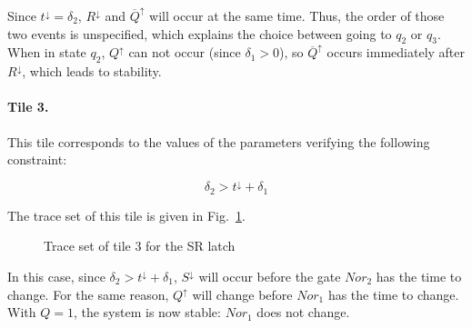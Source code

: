 \documentclass[a4paper,10pt]{article}
\begin{document}
Since $t^\downarrow = \delta_2$, $R^\downarrow$ and $\overline{Q}^\uparrow$ will occur at the same time.
Thus, the order of those two events is unspecified, which explains the choice between going to $q_2$ or $q_3$.
When in state $q_2$, $Q^\uparrow$ can not occur (since $\delta_1 > 0$), so $\overline{Q}^\uparrow$ occurs immediately after $R^\downarrow$, which leads to stability.


\paragraph*{Tile 3.}
This tile corresponds to the values of the parameters verifying the following constraint:

$$ \delta_2 > t^\downarrow + \delta_1 $$

The trace set of this tile is given in Fig.~\ref{fig:sr_tile_3}.

\begin{figure}[ht]
\centering
\footnotesize

\caption{Trace set of tile 3 for the SR latch}
\label{fig:sr_tile_3}
\end{figure}

In this case, since $\delta_2 > t^\downarrow + \delta_1 $, $S^\downarrow$ will occur before the gate $\mathit{Nor}_2$ has the time to change.
For the same reason, $Q^\uparrow$ will change before $\mathit{Nor}_1$ has the time to change.
With $Q = 1$, the system is now stable: $\mathit{Nor}_1$ does not change.
\end{document}
